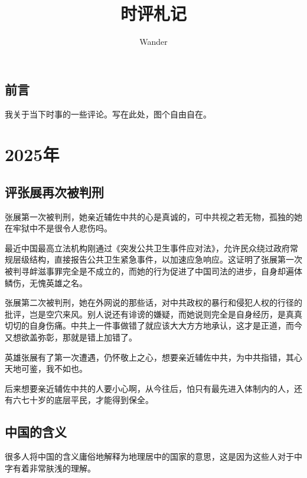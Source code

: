 \documentclass[12pt,oneside]{book}
\title{时评札记}
\author{Wander}
\begin{document}
\makemytitle



\frontmatter 
{}
\chapter*{前言}
我关于当下时事的一些评论。写在此处，图个自由自在。



\setcounter{tocdepth}{2}    
\tableofcontents


\mainmatter


\part{2025年}

\chapter{评张展再次被判刑}
张展第一次被判刑，她亲近辅佐中共的心是真诚的，可中共视之若无物，孤独的她在牢狱中不是很令人悲伤吗。

最近中国最高立法机构刚通过《突发公共卫生事件应对法》，允许民众绕过政府常规层级结构，直接报告公共卫生紧急事件，以加速应急响应。这证明了张展第一次被判寻衅滋事罪完全是不成立的，而她的行为促进了中国司法的进步，自身却遍体鳞伤，无愧英雄之名。

张展第二次被判刑，她在外网说的那些话，对中共政权的暴行和侵犯人权的行径的批评，岂是空穴来风。别人说还有诽谤的嫌疑，而她说则完全是自身经历，是真真切切的自身伤痛。中共上一件事做错了就应该大大方方地承认，这才是正道，而今又想欲盖弥彰，那就是错上加错了。

英雄张展有了第一次遭遇，仍怀敬上之心，想要亲近辅佐中共，为中共指错，其心天地可鉴，我不如也。

后来想要亲近辅佐中共的人要小心啊，从今往后，怕只有最先进入体制内的人，还有六七十岁的底层平民，才能得到保全。


\chapter{中国的含义}
很多人将中国的含义庸俗地解释为地理居中的国家的意思，这是因为这些人对于中字有着非常肤浅的理解。
\end{document}
